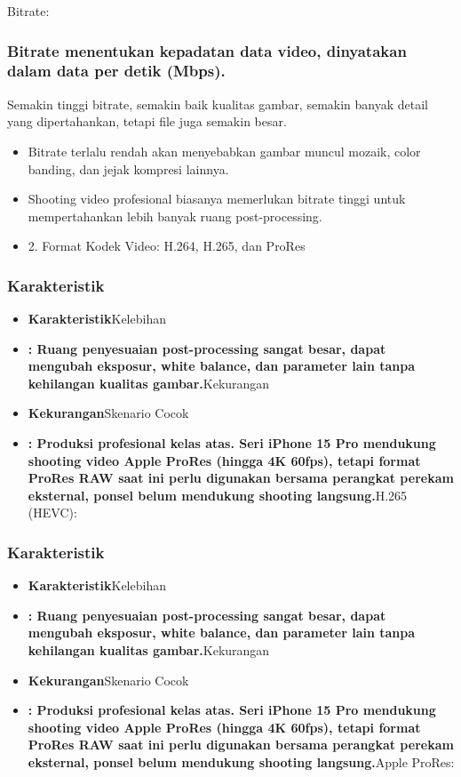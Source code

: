 Bitrate:

\subsubsection*{Bitrate menentukan kepadatan data video, dinyatakan dalam data per detik (Mbps).}

Semakin tinggi bitrate, semakin baik kualitas gambar, semakin banyak detail yang dipertahankan, tetapi file juga semakin besar.

\begin{itemize}
  \item Bitrate terlalu rendah akan menyebabkan gambar muncul mozaik, color banding, dan jejak kompresi lainnya.
  \item Shooting video profesional biasanya memerlukan bitrate tinggi untuk mempertahankan lebih banyak ruang post-processing.
  \item 2. Format Kodek Video: H.264, H.265, dan ProRes
\end{itemize}


\subsubsection*{Karakteristik}

\begin{itemize}
  \item \textbf{Karakteristik}Kelebihan
  \item \textbf{: Ruang penyesuaian post-processing sangat besar, dapat mengubah eksposur, white balance, dan parameter lain tanpa kehilangan kualitas gambar.}Kekurangan
  \item \textbf{Kekurangan}Skenario Cocok
  \item \textbf{: Produksi profesional kelas atas. Seri iPhone 15 Pro mendukung shooting video Apple ProRes (hingga 4K 60fps), tetapi format ProRes RAW saat ini perlu digunakan bersama perangkat perekam eksternal, ponsel belum mendukung shooting langsung.}H.265 (HEVC):
\end{itemize}

\subsubsection*{Karakteristik}

\begin{itemize}
  \item \textbf{Karakteristik}Kelebihan
  \item \textbf{: Ruang penyesuaian post-processing sangat besar, dapat mengubah eksposur, white balance, dan parameter lain tanpa kehilangan kualitas gambar.}Kekurangan
  \item \textbf{Kekurangan}Skenario Cocok
  \item \textbf{: Produksi profesional kelas atas. Seri iPhone 15 Pro mendukung shooting video Apple ProRes (hingga 4K 60fps), tetapi format ProRes RAW saat ini perlu digunakan bersama perangkat perekam eksternal, ponsel belum mendukung shooting langsung.}Apple ProRes:
\end{itemize}

